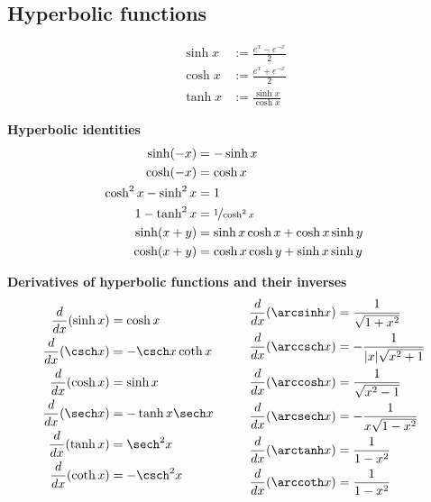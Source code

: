 \documentclass{article}
\begin{document}
\subsection{Hyperbolic functions}
\begin{definition}
    \begin{align*}
        \sinh x &:= \frac{e^x-e^{-x}}{2}\\
        \cosh x &:= \frac{e^x+e^{-x}}{2}\\
        \tanh x &:= \frac{\sinh x}{\cosh x}
    \end{align*}
\end{definition}
\begin{theorem}
    \textbf{Hyperbolic identities}
    \begin{align*}
        \sinh(-x) &= -\sinh x\\
        \cosh(-x) &= \cosh x\\
        \cosh^2x - \sinh^2x &= 1\\
        1-\tanh^2 x &= \nicefrac{1}{\cosh^2x}\\
        \sinh(x+y) &=\sinh x \cosh x + \cosh x \sinh y\\
        \cosh(x+y) &= \cosh x \cosh y + \sinh x \sinh y 
    \end{align*}
\end{theorem}
\begin{theorem}
    \textbf{Derivatives of hyperbolic functions and their inverses}
    \begin{align*}
        \begin{aligned}
            \frac{d}{dx}(\sinh x)&=\cosh x\\
            \frac{d}{dx}(\csch x)&=-\csch x \coth x\\
            \frac{d}{dx}(\cosh x)&=\sinh x\\
            \frac{d}{dx}(\sech x)&= -\tanh x \sech x\\
            \frac{d}{dx}(\tanh x)&=\sech^2 x\\
            \frac{d}{dx}(\coth x)&= -\csch^2 x
        \end{aligned}
        \hspace{1cm}
        \begin{aligned}
            \frac{d}{dx}(\arcsinh x)&=\frac{1}{\sqrt{1+x^2}}\\
            \frac{d}{dx}(\arccsch x)&=-\frac{1}{|x|\sqrt{x^2+1}}\\
            \frac{d}{dx}(\arccosh x)&=\frac{1}{\sqrt{x^2-1}}\\
            \frac{d}{dx}(\arcsech x)&= -\frac{1}{x\sqrt{1-x^2}}\\
            \frac{d}{dx}(\arctanh x)&=\frac{1}{1-x^2}\\
            \frac{d}{dx}(\arccoth x)&= \frac{1}{1-x^2}
        \end{aligned}
    \end{align*}
\end{theorem}
\end{document}
